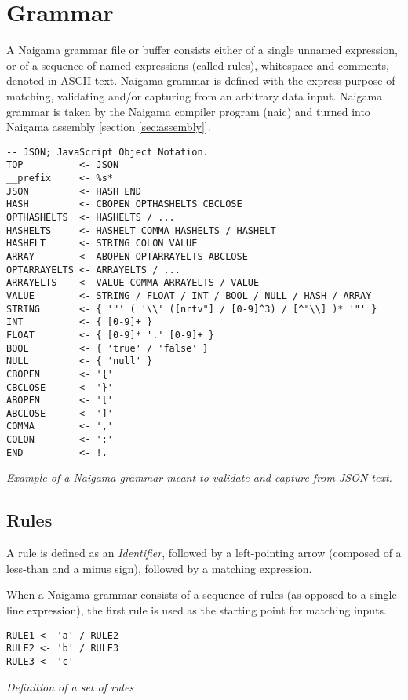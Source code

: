 \section{Grammar}
\label{sec:grammar}

A Naigama grammar file or buffer consists either of a single
unnamed expression, or of a sequence of named expressions (called rules),
whitespace and comments, denoted in ASCII text.
Naigama grammar is defined with the express purpose of matching, validating
and/or capturing from an arbitrary data input.
Naigama grammar is taken by the Naigama compiler program (naic) and turned
into Naigama assembly [section \ref{sec:assembly}].

\begin{myquote}
\begin{verbatim}
-- JSON; JavaScript Object Notation.
TOP          <- JSON
__prefix     <- %s*
JSON         <- HASH END
HASH         <- CBOPEN OPTHASHELTS CBCLOSE
OPTHASHELTS  <- HASHELTS / ...
HASHELTS     <- HASHELT COMMA HASHELTS / HASHELT
HASHELT      <- STRING COLON VALUE
ARRAY        <- ABOPEN OPTARRAYELTS ABCLOSE
OPTARRAYELTS <- ARRAYELTS / ...
ARRAYELTS    <- VALUE COMMA ARRAYELTS / VALUE
VALUE        <- STRING / FLOAT / INT / BOOL / NULL / HASH / ARRAY
STRING       <- { '"' ( '\\' ([nrtv"] / [0-9]^3) / [^"\\] )* '"' }
INT          <- { [0-9]+ }
FLOAT        <- { [0-9]* '.' [0-9]+ }
BOOL         <- { 'true' / 'false' }
NULL         <- { 'null' }
CBOPEN       <- '{'
CBCLOSE      <- '}'
ABOPEN       <- '['
ABCLOSE      <- ']'
COMMA        <- ','
COLON        <- ':'
END          <- !.
\end{verbatim}
\end{myquote}
\textit{Example of a Naigama grammar meant to validate and capture from
JSON\cite{bib:json} text.}

\subsection{Rules}

A rule is defined as an \textit{Identifier}, followed by a
left-pointing arrow (composed of a less-than and a minus sign),
followed by a matching expression.

When a Naigama grammar consists of a sequence of rules
(as opposed to a single line expression),
the first rule is used as the starting point for matching inputs.

\begin{myquote}
\begin{verbatim}
RULE1 <- 'a' / RULE2
RULE2 <- 'b' / RULE3
RULE3 <- 'c'
\end{verbatim}
\end{myquote}
\textit{Definition of a set of rules}

